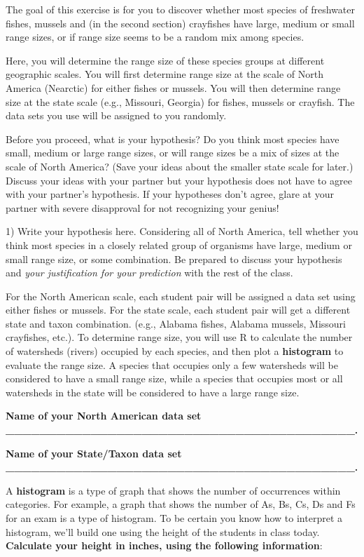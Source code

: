 The goal of this exercise is for you to discover whether most species of
freshwater fishes, mussels and (in the second section) crayfishes have
large, medium or small range sizes, or if range size seems to be a
random mix among species.

Here, you will determine the range size of these species groups at
different geographic scales. You will first determine range size at the
scale of North America (Nearctic) for either fishes or mussels. You will
then determine range size at the state scale (e.g., Missouri, Georgia)
for fishes, mussels or crayfish. The data sets you use will be assigned
to you randomly.

Before you proceed, what is your hypothesis? Do you think most species
have small, medium or large range sizes, or will range sizes be a mix of
sizes at the scale of North America? (Save your ideas about the smaller
state scale for later.) Discuss your ideas with your partner but your
hypothesis does not have to agree with your partner's hypothesis. If
your hypotheses don't agree, glare at your partner with severe
disapproval for not recognizing your genius!

1) Write your hypothesis here. Considering all of North America, tell
whether you think most species in a closely related group of organisms
have large, medium or small range size, or some combination. Be prepared
to discuss your hypothesis and \emph{your justification for your
prediction} with the rest of the class.

For the North American scale, each student pair will be assigned a data
set using either fishes or mussels. For the state scale, each student
pair will get a different state and taxon combination. (e.g., Alabama
fishes, Alabama mussels, Missouri crayfishes, etc.). To determine range
size, you will use R to calculate the number of watersheds (rivers)
occupied by each species, and then plot a \textbf{histogram} to evaluate
the range size. A species that occupies only a few watersheds will be
considered to have a small range size, while a species that occupies
most or all watersheds in the state will be considered to have a large
range size.

\textbf{Name of your North American data set
\_\_\_\_\_\_\_\_\_\_\_\_\_\_\_\_\_\_\_\_\_\_\_\_\_\_\_\_\_\_\_\_\_\_\_\_\_\_\_\_\_.}

\textbf{Name of your State/Taxon data set
\_\_\_\_\_\_\_\_\_\_\_\_\_\_\_\_\_\_\_\_\_\_\_\_\_\_\_\_\_\_\_\_\_\_\_\_\_\_\_\_\_.}

A \textbf{histogram} is a type of graph that shows the number of
occurrences within categories. For example, a graph that shows the
number of As, Bs, Cs, Ds and Fs for an exam is a type of histogram. To
be certain you know how to interpret a histogram, we'll build one using
the height of the students in class today. \textbf{Calculate your height
in inches, using the following information}:

